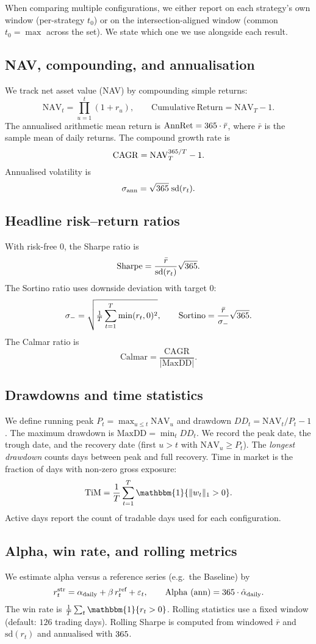 When comparing multiple configurations, we either report on each strategy’s own window (per-strategy $t_0$) or on the intersection-aligned window (common $t_0=\max$ across the set). We state which one we use alongside each result.

\subsection{NAV, compounding, and annualisation}
We track net asset value (NAV) by compounding simple returns:
\[
\mathrm{NAV}_t=\prod_{u=1}^{t}(1+r_u), \qquad \mathrm{Cumulative\ Return}=\mathrm{NAV}_T-1.
\]
The annualised arithmetic mean return is $\mathrm{AnnRet}=365\cdot \bar r$, where $\bar r$ is the sample mean of daily returns. The compound growth rate is
\[
\mathrm{CAGR}=\mathrm{NAV}_T^{365/T}-1.
\]
Annualised volatility is
\[
\sigma_{\mathrm{ann}}=\sqrt{365}\;\mathrm{sd}(r_t).
\]

\subsection{Headline risk–return ratios}
With risk-free $0$, the Sharpe ratio is
\[
\mathrm{Sharpe}=\frac{\bar r}{\mathrm{sd}(r_t)}\sqrt{365}.
\]
The Sortino ratio uses downside deviation with target $0$:
\[
\sigma_{-}=\sqrt{\tfrac{1}{T}\sum_{t=1}^{T}\min(r_t,0)^2},\qquad
\mathrm{Sortino}=\frac{\bar r}{\sigma_{-}}\sqrt{365}.
\]
The Calmar ratio is
\[
\mathrm{Calmar}=\frac{\mathrm{CAGR}}{\lvert \mathrm{MaxDD}\rvert}.
\]

\subsection{Drawdowns and time statistics}
We define running peak $P_t=\max_{u\le t}\mathrm{NAV}_u$ and drawdown $DD_t=\mathrm{NAV}_t/P_t-1$. The maximum drawdown is $\mathrm{MaxDD}=\min_t DD_t$. We record the peak date, the trough date, and the recovery date (first $u>t$ with $\mathrm{NAV}_u\ge P_t$). The \emph{longest drawdown} counts days between peak and full recovery. Time in market is the fraction of days with non-zero gross exposure:
\[
\mathrm{TiM}=\frac{1}{T}\sum_{t=1}^{T}\mathbbm{1}\{\|w_t\|_1>0\}.
\]
Active days report the count of tradable days used for each configuration.

\subsection{Alpha, win rate, and rolling metrics}
We estimate alpha versus a reference series (e.g.\ the Baseline) by
\[
r^{\text{str}}_t=\alpha_{\text{daily}}+\beta\,r^{\text{ref}}_t+\varepsilon_t,\qquad
\mathrm{Alpha\ (ann)}=365\cdot\hat\alpha_{\text{daily}}.
\]
The win rate is $\frac{1}{T}\sum_{t}\mathbbm{1}\{r_t>0\}$. Rolling statistics use a fixed window (default: $126$ trading days). Rolling Sharpe is computed from windowed $\bar r$ and $\mathrm{sd}(r_t)$ and annualised with $365$.

